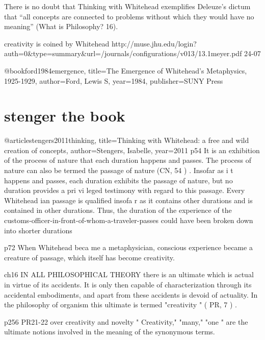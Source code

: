	
There is no doubt that Thinking with Whitehead exemplifies Deleuze’s dictum that
“all concepts are connected to problems without which they would have no meaning”
(What is Philosophy? 16).


creativity is coined by Whitehead 
\cite{steven meyer}
http://muse.jhu.edu/login?auth=0&type=summary&url=/journals/configurations/v013/13.1meyer.pdf
24-07

\cite{Ford}
@book{ford1984emergence,
	title={The Emergence of Whitehead's Metaphysics, 1925-1929},
	author={Ford, Lewis S},
	year={1984},
	publisher={SUNY Press}
}

\section{stenger the book}
@article{stengers2011thinking,
	title={Thinking with Whitehead: a free and wild creation of concepts},
	author={Stengers, Isabelle},
	year={2011}
	}
p54
It is an exhibition of the process of nature that each duration happens
and passes. The process of nature can also be termed the passage of nature
(CN, 54 ) .
Insofar as i t happens and passes, each duration exhibits the passage of
nature, but no duration provides a pri vi leged testimony with regard to
this passage. Every Whitehead ian passage is qualified insofa r as it contains
other durations and is contained in other durations. Thus, the duration of
the experience of the customs-officer-in-front-of-whom-a-traveler-passes
could have been broken down into shorter durations

p72
When Whitehead beca me a metaphysician,
conscious experience became a creature of passage, which itself has
become creativity.

ch16
IN ALL PHILOSOPHICAL THEORY there is an ultimate which is actual
in virtue of its accidents. It is only then capable of characterization
through its accidental embodiments, and apart from these
accidents is devoid of actuality. In the philosophy of organism this ultimate
is termed "creativity " ( PR, 7 ) .

p256 PR21-22 over creativity and novelty
" Creativity," "many," "one " are the ultimate notions involved in the
meaning of the synonymous terms.

